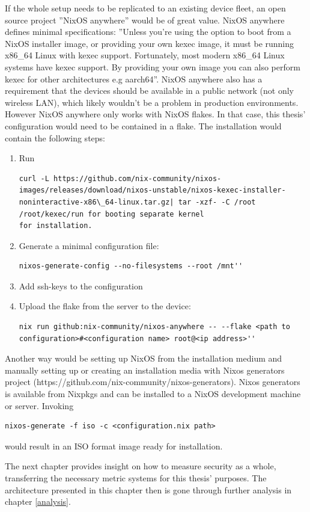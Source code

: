 If the whole setup needs to be replicated to an existing device fleet,
an open source project ''NixOS anywhere'' would be of great value. NixOS
anywhere defines minimal specifications: ''Unless you're using the
option to boot from a NixOS installer image, or providing your own
kexec image, it must be running x86\_64 Linux with kexec
support. Fortunately, most modern x86\_64 Linux systems have kexec
support. By providing your own image you can also perform kexec for
other architectures e.g aarch64''. NixOS anywhere also has a
requirement that the devices should be available in a public network
(not only wireless LAN), which likely wouldn't be a problem in
production environments. However NixOS anywhere  only works with NixOS
flakes. In that case, this thesis' configuration would need to be contained in a
flake. \cite{githubGitHubNixcommunitynixosanywhere}
The installation would contain the following steps:
\begin{enumerate}
\item Run
\begin{lstlisting}
curl -L https://github.com/nix-community/nixos-images/releases/download/nixos-unstable/nixos-kexec-installer-noninteractive-x86\_64-linux.tar.gz| tar -xzf- -C /root /root/kexec/run for booting separate kernel
for installation.
\end{lstlisting}
\item Generate a minimal configuration file:
\begin{lstlisting}
nixos-generate-config --no-filesystems --root /mnt''
\end{lstlisting}
\item Add ssh-keys to the configuration
\item Upload the flake from the server to the device:
\begin{lstlisting}
nix run github:nix-community/nixos-anywhere -- --flake <path to configuration>#<configuration name> root@<ip address>''
\end{lstlisting}
\end{enumerate}
Another way would be setting up NixOS from the installation medium and
manually setting up or creating an installation media with Nixos
generators project
(https://github.com/nix-community/nixos-generators). Nixos generators
is available from Nixpkgs and can be installed to a NixOS
development machine or server. Invoking
\begin{lstlisting}
nixos-generate -f iso -c <configuration.nix path>
\end{lstlisting}
would result in an ISO format image ready for
installation. \cite{githubGitHubNixcommunitynixosanywhere}

The next chapter provides insight on how to measure security as a
whole, transferring the necessary metric systems for this thesis'
purposes. The architecture presented in this chapter then is gone
through further analysis in chapter \ref{analysis}.
